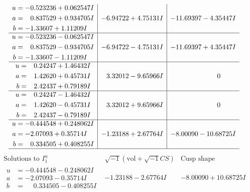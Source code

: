 \documentclass[1p]{elsarticle_modified}
\theoremstyle{definition}
\newcommand{\I}{\sqrt{-1}}
\begin{document}
$$\begin{array}{c|c|c}
\begin{aligned}
u &= -0.523236 + 0.062547 I \\
a &= \phantom{-}0.837529 + 0.934705 I \\
b &= -1.33607 + 1.11209 I\end{aligned}
 & -6.94722 + 4.75131 I & -11.69397 - 4.35447 I \\ \hline\begin{aligned}
u &= -0.523236 - 0.062547 I \\
a &= \phantom{-}0.837529 - 0.934705 I \\
b &= -1.33607 - 1.11209 I\end{aligned}
 & -6.94722 - 4.75131 I & -11.69397 + 4.35447 I \\ \hline\begin{aligned}
u &= \phantom{-}0.24247 + 1.46432 I \\
a &= \phantom{-}1.42620 + 0.45731 I \\
b &= \phantom{-}2.42437 + 0.79189 I\end{aligned}
 & \phantom{-}3.32012 - 9.65966 I & \phantom{-0.000000 } 0 \\ \hline\begin{aligned}
u &= \phantom{-}0.24247 - 1.46432 I \\
a &= \phantom{-}1.42620 - 0.45731 I \\
b &= \phantom{-}2.42437 - 0.79189 I\end{aligned}
 & \phantom{-}3.32012 + 9.65966 I & \phantom{-0.000000 } 0 \\ \hline\begin{aligned}
u &= -0.444548 + 0.248062 I \\
a &= -2.07093 + 0.35714 I \\
b &= \phantom{-}0.334505 + 0.408255 I\end{aligned}
 & -1.23188 + 2.67764 I & -8.00090 - 10.68725 I\\
 \hline 
 \end{array}$$\newpage$$\begin{array}{c|c|c}  
\text{Solutions to }I^u_{1}& \I (\text{vol} + \sqrt{-1}CS) & \text{Cusp shape}\\
 \hline 
\begin{aligned}
u &= -0.444548 - 0.248062 I \\
a &= -2.07093 - 0.35714 I \\
b &= \phantom{-}0.334505 - 0.408255 I\end{aligned}
 & -1.23188 - 2.67764 I & -8.00090 + 10.68725 I \\ \hline\begin{aligned}

\end{aligned}
\end{array}$$
\end{document}
